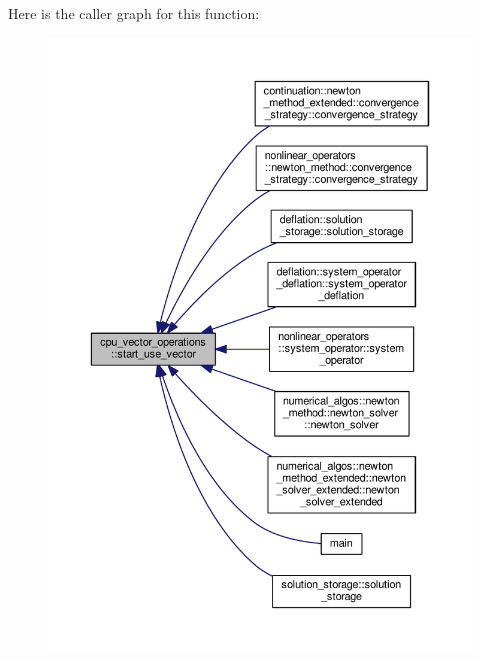 Here is the caller graph for this function\-:\nopagebreak
\begin{figure}[H]
\begin{center}
\leavevmode
\includegraphics[width=350pt]{structcpu__vector__operations_a36ce15d54cfb2b08aeeb25d7e601e342_icgraph}
\end{center}
\end{figure}


